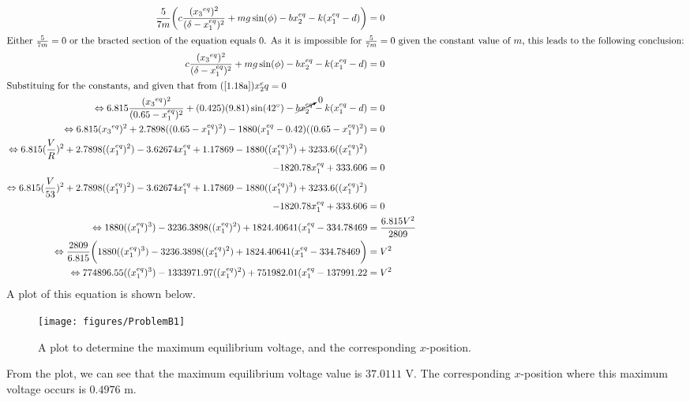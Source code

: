 \documentclass[a4paper,10pt,reqno]{amsart}
\numberwithin{equation}{section}
\begin{document}
\begin{align}
\frac{5}{7m}\bigg(c \frac{({x_3}^{eq})^2}{(\delta - x_1^{eq})^2} + mg\sin(\phi) - bx_2^{eq} - k(x_1^{eq}-d)\bigg) &= 0 \nonumber \\
\intertext{Either $\frac{5}{7m} = 0$ or the bracted section of the equation equals 0. As it is impossible for $\frac{5}{7m} = 0$ given the constant value of $m$, this leads to the following conclusion:}
c \frac{({x_3}^{eq})^2}{(\delta - x_1^{eq})^2} + mg\sin(\phi) - bx_2^{eq} - k(x_1^{eq}-d) &= 0 \nonumber \\
\intertext{Substituing for the constants, and given that from (\ref{1.18a})$x_2^eq = 0$}
\Leftrightarrow 6.815 \frac{({x_3}^{eq})^2}{(0.65 - x_1^{eq})^2} + (0.425)(9.81)\sin(42^\circ) - \cancelto{0}{bx_2^{eq}} - k(x_1^{eq}-d) &= 0 \nonumber \\
\Leftrightarrow 6.815 ({x_3}^{eq})^2 + 2.7898((0.65 - x_1^{eq})^2) - 1880(x_1^{eq}-0.42)((0.65 - x_1^{eq})^2) &= 0 \nonumber \\
\Leftrightarrow 6.815 (\frac{V}{R})^2 + 2.7898((x_1^{eq})^2) - 3.62674x_1^{eq} + 1.17869 - 1880((x_1^{eq})^3) + 3233.6((x_1^{eq})^2) \nonumber \\ - 1820.78x_1^{eq} + 333.606 &= 0 \nonumber \\
\Leftrightarrow 6.815 (\frac{V}{53})^2 + 2.7898((x_1^{eq})^2) - 3.62674x_1^{eq} + 1.17869 - 1880((x_1^{eq})^3) + 3233.6((x_1^{eq})^2) \nonumber \\ - 1820.78x_1^{eq} + 333.606 &= 0 \nonumber \\
\Leftrightarrow 1880((x_1^{eq})^3) - 3236.3898((x_1^{eq})^2) + 1824.40641(x_1^{eq} - 334.78469 &= \frac{6.815V^2}{2809} \nonumber \\
\Leftrightarrow \frac{2809}{6.815}\bigg(1880((x_1^{eq})^3) - 3236.3898((x_1^{eq})^2) + 1824.40641(x_1^{eq} - 334.78469 \bigg) &= V^2 \nonumber \\ 
\Leftrightarrow 774896.55((x_1^{eq})^3) - 1333971.97((x_1^{eq})^2) + 751982.01(x_1^{eq} - 137991.22 &= V^2 \label{eqn: B1deriv}
\end{align}
A plot of this equation is shown below.
\begin{figure}[h]
\centering
\texttt{[image: figures/ProblemB1]}
\caption{A plot to determine the maximum equilibrium voltage, and the corresponding $x$-position.}
\label{fig:B1plot}
\end{figure}

From the plot, we can see that the maximum equilibrium voltage value is $37.0111$ V. The corresponding $x$-position where this maximum voltage occurs is $0.4976$ m.
\end{document}
